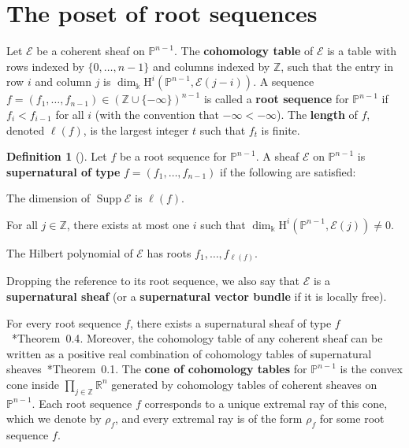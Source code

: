 \documentclass[12pt]{amsart}
\theoremstyle{definition}
\newtheorem{defn}[equation]{Definition}
\newenvironment{definition}[1][]{\begin{defn}[#1]\pushQED{\qed}}{\popQED \end{defn}}
\newcommand{\Supp}{\operatorname{Supp}}
\newcommand{\Hs}{\mathrm{H}}
\newcommand{\EE}{\mathcal{E}}
\newcommand{\PP}{\mathbb{P}}
\newcommand{\ZZ}{\mathbb{Z}}
\newcommand{\RR}{\mathbb{R}}
\newcommand{\defi}[1]{{\upshape\bfseries #1}}
\begin{document}
\section{The poset of root sequences}%
\label{sec:prelim root}

Let $\EE$ be a coherent sheaf on $\PP^{n-1}$. 
The \defi{cohomology table} of $\EE$ is a table 
with rows indexed by $\{0, \ldots, n-1\}$ and columns indexed by $\ZZ$, 
such that the entry in row $i$ and column $j$ is 
$\dim_\Bbbk \Hs^i(\PP^{n-1}, \EE(j-i))$. 
%
A sequence 
$f=(f_1, \dots, f_{n-1})\in \left(\ZZ\cup\{-\infty\}\right)^{n-1}$ 
is called a \defi{root sequence} for $\PP^{n-1}$
if $f_i<f_{i-1}$ for all $i$ (with the convention that $-\infty<-\infty$).  
The \defi{length} of $f$, denoted $\ell(f)$, is the largest integer $t$
such that $f_t$ is finite.
\begin{definition}\label{def:supernatural}
Let $f$ be a root sequence for $\PP^{n-1}$. A sheaf $\EE$ on $\PP^{n-1}$ is
\defi{supernatural of type} $f=(f_1, \dots, f_{n-1})$ if the following are satisfied: 
\begin{asparaenum}
\item The dimension of $\Supp \EE$ is $\ell(f)$.
\item For all $j\in \mathbb Z$, there exists at most one $i$ 
		such that $\dim_\Bbbk \Hs^i(\PP^{n-1}, \EE(j))\ne 0$.
\item The Hilbert polynomial of $\EE$ has roots $f_1, \dots, f_{\ell(f)}$.
\end{asparaenum}
Dropping the reference to its root sequence, 
we also say that $\EE$ is a \defi{supernatural sheaf} 
(or a \defi{supernatural vector bundle} if it is locally free). 
\end{definition}

For every root sequence $f$, there exists a supernatural sheaf of type
$f$~\cite{EiScConjOfBS07}*{Theorem~0.4}. 
Moreover, the cohomology table of any coherent sheaf 
can be written as a positive real combination of cohomology tables 
of supernatural sheaves~\cite{EiScSupNat09}*{Theorem~0.1}.
The \defi{cone of cohomology tables} for $\PP^{n-1}$ 
is the convex cone inside $\prod_{j \in \ZZ}\RR^n$ 
generated by cohomology tables of coherent sheaves on $\PP^{n-1}$.  
Each root sequence $f$ corresponds to a unique extremal ray of this cone, 
which we denote by $\rho_f$, and  
every extremal ray is of the form $\rho_f$ for some root sequence $f$.
\end{document}
